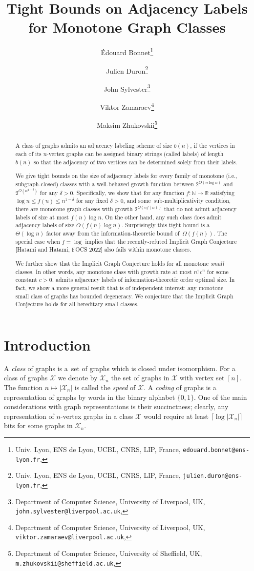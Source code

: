 \documentclass[letterpaper,11pt]{article}
\title{Tight Bounds on Adjacency Labels for Monotone Graph Classes}
\date{}
\author{ }
\author{{\'E}douard Bonnet\thanks{Univ. Lyon, ENS de Lyon, UCBL, CNRS, LIP, France,  \texttt{edouard.bonnet@ens-lyon.fr}, \orcidlink{0000-0002-1653-5822}}    \and Julien Duron\thanks{Univ. Lyon, ENS de Lyon, UCBL, CNRS, LIP, France, \texttt{julien.duron@ens-lyon.fr}, \orcidlink{0009-0004-0925-9438}} \and    John Sylvester\thanks{Department of Computer Science, University of Liverpool, UK, \texttt{john.sylvester@liverpool.ac.uk}, \orcidlink{0000-0002-6543-2934}}
	\and
	Viktor Zamaraev\thanks{Department of Computer Science, University of Liverpool, UK, \texttt{viktor.zamaraev@liverpool.ac.uk}, \orcidlink{0000-0001-5755-4141}}
	\and Maksim Zhukovskii\thanks{Department of Computer Science, University of Sheffield, UK, \texttt{m.zhukovskii@sheffield.ac.uk}, \orcidlink{0000-0001-8763-9533} }}
\newcommand{\Xc}{\mathcal{X}}
\theoremstyle{definition}
\theoremstyle{remark}
\begin{document}

\maketitle

\begin{abstract}
  A class of graphs admits an adjacency labeling scheme of size $b(n)$, if the vertices in each of its $n$-vertex graphs can be assigned binary strings (called labels) of length $b(n)$ so that the adjacency of two vertices can be determined solely from their labels.
  
  We give tight bounds on the size of adjacency labels for every family of monotone (i.e., subgraph-closed) classes with a well-behaved growth function between $2^{O(n \log n)}$ and $2^{O(n^{2-\delta})}$ for any $\delta > 0$.
  Specifically, we show that for any function $f: \mathbb N \to \mathbb R$ satisfying $\log n \leqslant f(n) \leqslant n^{1-\delta}$ for any fixed $\delta > 0$, and some~sub-multiplicativity condition, there are monotone graph classes with growth $2^{O(nf(n))}$ that do not admit adjacency labels of size at most $f(n) \log n$.
  On the other hand, any such class does admit adjacency labels of size $O(f(n)\log n)$.
  Surprisingly this tight bound is a $\Theta(\log n)$ factor away from the information-theoretic bound of~$\Omega(f(n))$.
  The special case when $f = \log$ implies that the recently-refuted Implicit Graph Conjecture [Hatami and Hatami, FOCS 2022] also fails within monotone classes. 
  
We further show that the Implicit Graph Conjecture holds for all monotone \emph{small} classes. In other words, any monotone class with growth rate at most $n!\,c^n$ for some constant $c>0$, admits adjacency labels of information-theoretic order optimal size. In fact, we show a more general result that is of independent interest: any monotone small class of graphs has bounded degeneracy.
  We conjecture that the Implicit Graph Conjecture holds for all hereditary small classes.
\end{abstract}

 
	
	\section{Introduction}
	\label{sec:new-intro}
	A \emph{class} of graphs is a~set of graphs which is closed under isomorphism. 
	For a class of graphs $\Xc$ we denote by $\Xc_n$ the set of graphs in $\Xc$ with vertex set $[n]$.
	The function $n \mapsto |\Xc_n|$ is called the \emph{speed} of $\Xc$. 
	A \emph{coding} of graphs is a representation of graphs by words in the binary alphabet $\{ 0, 1 \}$.  One of the main considerations with graph representations is their succinctness; clearly, any representation of $n$-vertex graphs in a class $\Xc$ would require at least $\lceil \log |\Xc_n| \rceil$ bits for some graphs in $\Xc_n$.	
	
\end{document}
